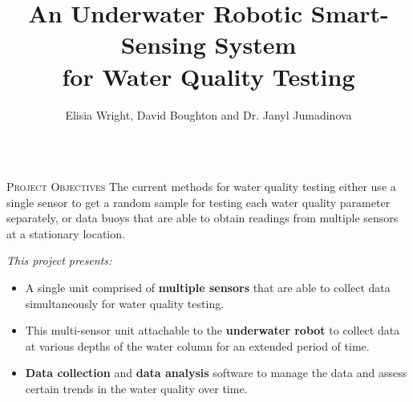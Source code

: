 \documentclass[final,t]{beamer}
\title[]{ An Underwater Robotic Smart-Sensing System \\ for Water Quality Testing }
\author[Wright]{Elisia Wright, David Boughton and Dr. Janyl Jumadinova}
\institute{Department of Computer Science, Allegheny College \\ Meadville, PA}
\begin{document}
    \begin{frame}{}
        \vspace*{-6mm}
        \begin{columns}[t]
        	\begin{column}{1\linewidth}

                \begin{alertblock}{\textsc{Project Objectives}}
                    \vspace*{3mm}
                    The current methods for water quality testing either use  a single 	
                    sensor to get a random sample for testing each water quality 											parameter separately, or data buoys that are able to obtain
                    readings from multiple sensors at a stationary location. 
                    \vspace{3mm}
                    
                    \emph{This project presents:}
                    \begin{itemize}
                        \item A single unit comprised of \textbf{multiple sensors} that are able to collect data simultaneously for water quality testing.
                        \item This multi-sensor unit attachable to the \textbf{underwater robot} to collect data at various depths of the water column for an extended period of time. 
                        \item \textbf{Data collection} and \textbf{data analysis} software to manage the data and assess certain trends in the water quality over time.
                    \end{itemize}
                    \vspace*{6mm}
                \end{alertblock}
			\end{column}
		\end{columns}
		
		

\end{frame}
\end{document}
